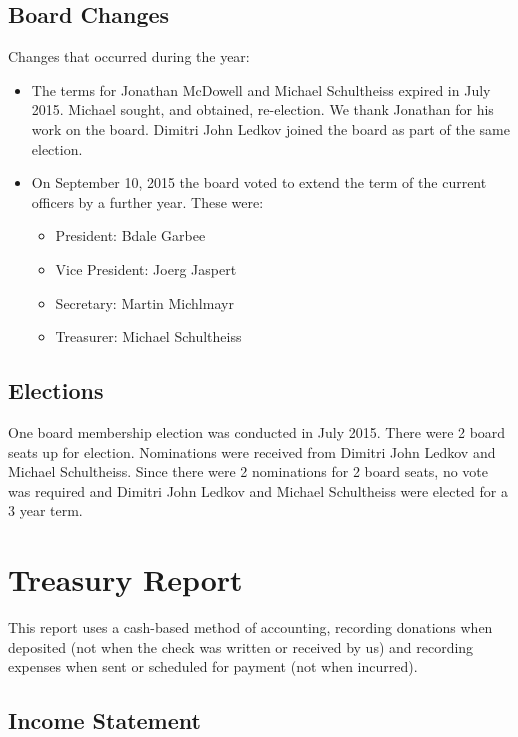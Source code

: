 \documentclass[letterpaper]{report}
\begin{document}
\section{Board Changes}

Changes that occurred during the year:

\begin{itemize} \item The terms for Jonathan McDowell and Michael
Schultheiss expired in July 2015.  Michael sought, and obtained,
re-election.  We thank Jonathan for his work on the board.  Dimitri John
Ledkov joined the board as part of the same election.

\item On September 10, 2015 the board voted to extend the term of the
current officers by a further year. These were:
\begin{itemize}
\item President: Bdale Garbee
\item Vice President: Joerg Jaspert
\item Secretary: Martin Michlmayr
\item Treasurer: Michael Schultheiss
\end{itemize}
\end{itemize}

\section{Elections}

One board membership election was conducted in July 2015.  There were 2
board seats up for election.  Nominations were received from Dimitri
John Ledkov and Michael Schultheiss.  Since there were 2 nominations for
2 board seats, no vote was required and Dimitri John Ledkov and Michael
Schultheiss were elected for a 3 year term.

\chapter{Treasury Report}

This report uses a cash-based method of accounting, recording donations when
deposited (not when the check was written or received by us) and recording
expenses when sent or scheduled for payment (not when incurred).

\section{Income Statement}
\end{document}

